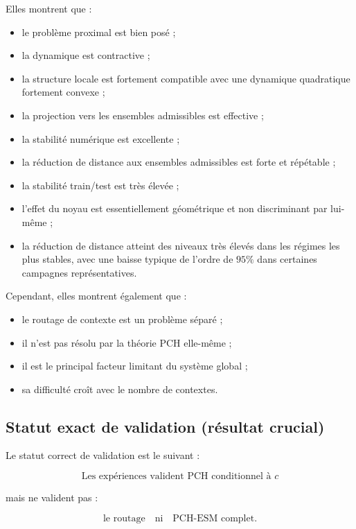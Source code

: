 \documentclass[11pt,a4paper]{article}
\newcommand{\1}{\mathbf 1}
\begin{document}
Elles montrent que :

\begin{itemize}[leftmargin=2em]
\item le problème proximal est bien posé ;
\item la dynamique est contractive ;
\item la structure locale est fortement compatible avec une dynamique quadratique fortement convexe ;
\item la projection vers les ensembles admissibles est effective ;
\item la stabilité numérique est excellente ;
\item la réduction de distance aux ensembles admissibles est forte et répétable ;
\item la stabilité train/test est très élevée ;
\item l’effet du noyau est essentiellement géométrique et non discriminant par lui-même ;
\item la réduction de distance atteint des niveaux très élevés dans les régimes les plus stables, avec une baisse typique de l’ordre de \(95\%\) dans certaines campagnes représentatives.
\end{itemize}

Cependant, elles montrent également que :

\begin{itemize}[leftmargin=2em]
\item le routage de contexte est un problème séparé ;
\item il n’est pas résolu par la théorie PCH elle-même ;
\item il est le principal facteur limitant du système global ;
\item sa difficulté croît avec le nombre de contextes.
\end{itemize}

\subsection{Statut exact de validation (résultat crucial)}

Le statut correct de validation est le suivant :

\[
\boxed{\text{Les expériences valident PCH conditionnel à } c}
\]

mais ne valident pas :

\[
\boxed{\text{le routage}}
\quad \text{ni} \quad
\boxed{\text{PCH-ESM complet}}.
\]
\end{document}
